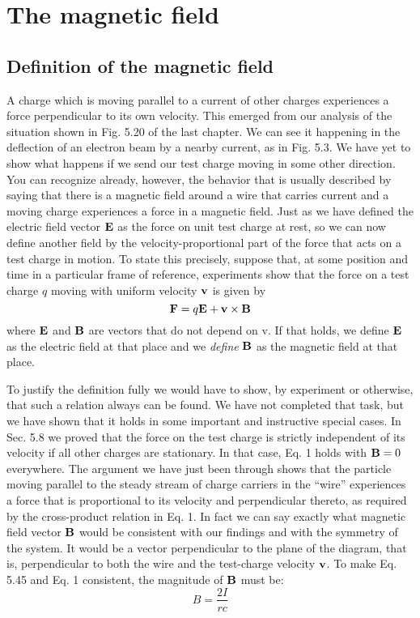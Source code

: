 \chapter{The magnetic field}

\section{Definition of the magnetic field}

A charge which is moving parallel to a current of other charges
experiences a force perpendicular to its own velocity. This emerged
from our analysis of the situation shown in Fig. 5.20 of the last
chapter. We can see it happening in the deflection of an electron
beam by a nearby current, as in Fig. 5.3. We have yet to show what
happens if we send our test charge moving in some other direction.
You can recognize already, however, the behavior that is usually
described by saying that there is a magnetic field around a wire that
carries current and a moving charge experiences a force in a magnetic
field. Just as we have defined the electric field vector $\mathbf{E}$ as the force
on unit test charge at rest, so we can now define another field by the
velocity-proportional part of the force that acts on a test charge in
motion. To state this precisely, suppose that, at some position and
time in a particular frame of reference, experiments show that the
force on a test charge $q$ moving with uniform velocity $\mathbf{v}$ is given by
\begin{equation}
  \mathbf{F} = q\mathbf{E}+\mathbf{v}\times\mathbf{B}
\end{equation}
where $\mathbf{E}$ and $\mathbf{B}$ are vectors that do not depend on v. If that holds,
we define $\mathbf{E}$ as the electric field at that place and we \emph{define} $\mathbf{B}$ as the
magnetic field at that place.

To justify the definition fully we would have to show, by experiment
or otherwise, that such a relation always can be found. We
have not completed that task, but we have shown that it holds in some
important and instructive special cases. In Sec. 5.8 we proved that
the force on the test charge is strictly independent of its velocity if
all other charges are stationary. In that case, Eq. 1 holds with $\mathbf{B} = 0$
everywhere. The argument we have just been through shows that
the particle moving parallel to the steady stream of charge carriers
in the ``wire'' experiences a force that is proportional to its velocity
and perpendicular thereto, as required by the cross-product relation
in Eq. 1. In fact we can say exactly what magnetic field vector $\mathbf{B}$
would be consistent with our findings and with the symmetry of the
system. It would be a vector perpendicular to the plane of the diagram,
that is, perpendicular to both the wire and the test-charge
velocity $\mathbf{v}$. To make Eq. 5.45 and Eq. 1 consistent, the magnitude
of $\mathbf{B}$ must be:
\begin{equation}
  B = \frac{2I}{rc}
\end{equation}

